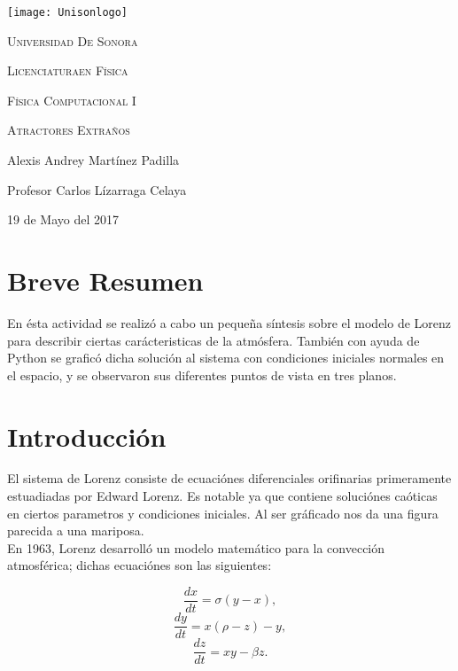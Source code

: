 \documentclass[12pt,a4paper]{article}
\begin{document}
\begin{titlepage}
	\centering
	\texttt{[image: Unisonlogo]}\par
    \vspace{1.3cm}
	\scshape \LARGE Universidad De Sonora \par
	\vspace{1cm}
	\scshape \Large Licenciaturaen Física\par
    \scshape \Large Física Computacional I \par
	\vspace{1.5cm}
	\huge \scshape Atractores Extraños\par
	\vspace{2cm}
	\Large Alexis Andrey Martínez Padilla\par
    \Large Profesor Carlos Lízarraga Celaya\par
    \vspace{2.5cm}
    \Large 19 de Mayo del 2017
\end{titlepage}

\section{Breve Resumen}

En ésta actividad se realizó a cabo un pequeña síntesis sobre el modelo de Lorenz para describir ciertas carácteristicas de la atmósfera. También con ayuda de Python se graficó dicha solución al sistema con condiciones iniciales normales en el espacio, y se observaron sus diferentes puntos de vista en tres planos.

\section{Introducción}

El sistema de Lorenz consiste de ecuaciónes diferenciales orifinarias primeramente estuadiadas por Edward Lorenz. Es notable ya que contiene soluciónes caóticas en ciertos parametros y condiciones iniciales. Al ser gráficado nos da una figura parecida a una mariposa. \\

En 1963, Lorenz desarrolló un modelo matemático para la convección atmosférica; dichas ecuaciónes son las siguientes:

\begin{centering}
$$\frac{dx}{dt} = \sigma(y-x),$$
$$\frac{dy}{dt} = x(\rho-z)-y,$$
$$\frac{dz}{dt} = xy-\beta z.$$
\end{centering}
\end{document}
